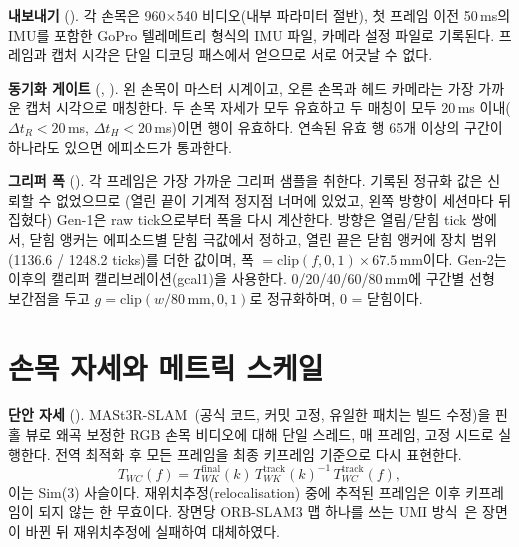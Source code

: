 \documentclass[conference,10pt]{IEEEtran}
\newcommand{\mm}{\,mm\xspace}
\begin{document}
\textbf{내보내기} (). 각 손목은 960$\times$540 비디오(내부 파라미터 절반), 첫 프레임
이전 50\,ms의 IMU를 포함한 GoPro 텔레메트리 형식의 IMU 파일, 카메라 설정 파일로 기록된다. 프레임과 캡처 시각은 단일 디코딩 패스에서
얻으므로 서로 어긋날 수 없다.

\textbf{동기화 게이트} (, ). 왼 손목이 마스터 시계이고, 오른 손목과 헤드
카메라는 가장 가까운 캡처 시각으로 매칭한다. 두 손목 자세가 모두 유효하고 두 매칭이 모두 20\,ms 이내($\Delta t_R<20$\,ms,
$\Delta t_H<20$\,ms)이면 행이 유효하다. 연속된 유효 행 65개 이상의 구간이 하나라도 있으면 에피소드가 통과한다.

\textbf{그리퍼 폭} (). 각 프레임은 가장 가까운 그리퍼 샘플을 취한다. 기록된 정규화 값은 신뢰할 수 없었으므로
(열린 끝이 기계적 정지점 너머에 있었고, 왼쪽 방향이 세션마다 뒤집혔다) Gen-1은 raw tick으로부터 폭을 다시 계산한다. 방향은 열림/닫힘
tick 쌍에서, 닫힘 앵커는 에피소드별 닫힘 극값에서 정하고, 열린 끝은 닫힘 앵커에 장치 범위(1136.6 / 1248.2 ticks)를 더한 값이며,
폭 $= \mathrm{clip}(f,0,1)\times 67.5$\mm{}이다. Gen-2는 이후의 캘리퍼 캘리브레이션(gcal1)을 사용한다. 0/20/40/60/80\mm{}에 구간별
선형 보간점을 두고 $g=\mathrm{clip}(w/80\,\text{mm},0,1)$로 정규화하며, 0 = 닫힘이다.

\section{손목 자세와 메트릭 스케일}\label{m:sec:pose}
\textbf{단안 자세} (). MASt3R-SLAM~\cite{murai2025mast3rslam}(공식 코드, 커밋 고정,
유일한 패치는 빌드 수정)을 핀홀 뷰로 왜곡 보정한 RGB 손목 비디오에 대해 단일 스레드, 매 프레임, 고정 시드로 실행한다. 전역 최적화
후 모든 프레임을 최종 키프레임 기준으로 다시 표현한다.
\begin{equation}
T_{WC}(f) = T_{WK}^{\text{final}}(k)\,T_{WK}^{\text{track}}(k)^{-1}\,T_{WC}^{\text{track}}(f),
\end{equation}
이는 Sim(3) 사슬이다. 재위치추정(relocalisation) 중에 추적된 프레임은 이후 키프레임이 되지 않는 한 무효이다. 장면당 ORB-SLAM3 맵
하나를 쓰는 UMI 방식~\cite{chi2024umi}은 장면이 바뀐 뒤 재위치추정에 실패하여 대체하였다.
\end{document}
